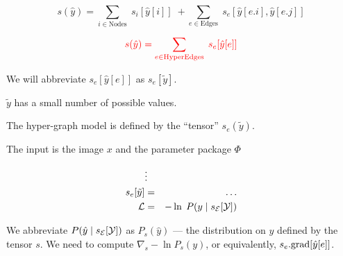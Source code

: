 $$s(\hat{y}) = \sum_{i \in \mathrm{Nodes}}\; s_i[\hat{y}[i]]\; + \sum_{e \in \mathrm{Edges}}\;s_e[\hat{y}[e.i],\hat{y}[e.j]]$$

\vfill

$${\color{red} s(\hat{y}) = \sum_{e \in \mathrm{HyperEdges}}  \; s_e[\hat{y}[e]]}$$



We will abbreviate $s_e[\hat{y}[e]]$ as {\color{red} $s_e[\tilde{y}]$}.

\vfill
{\color{red} $\tilde{y}$ has a small number of possible values.}

\vfill
The hyper-graph model is defined by the ``tensor'' {\color{red} $s_e(\tilde{y})$}.



The input is the image $x$ and the parameter package $\Phi$

\begin{eqnarray*}
 & \vdots & \\
s_e[\tilde{y}] & = & \ldots \\
{\cal L} & = & - \ln\; P(y\;|\;s_{\cal E}[{\cal Y}])
\end{eqnarray*}

\vfill We abbreviate $P(\hat{y}\;|\;s_{\cal E}[{\cal Y}])$ as {\color{red} $P_s(\hat{y})$} --- the distribution on $\hat{y}$ defined by the tensor $s$.
\vfill
We need to compute {\color{red} $\nabla_s -\ln P_s(y)$}, or equivalently, {\color{red} $s_e.\mathrm{grad}[\hat{y}[e]]$}.


